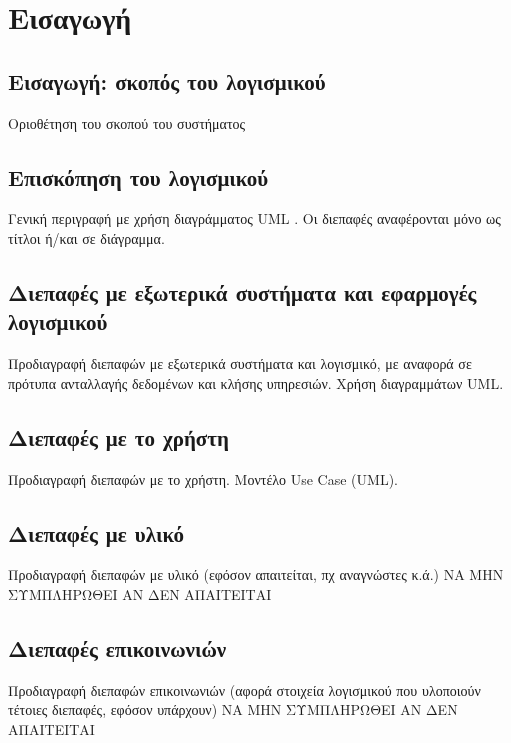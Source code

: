 \section{Εισαγωγή}

\subsection{Εισαγωγή: σκοπός του λογισμικού}
Οριοθέτηση του σκοπού του συστήματος

\subsection{Επισκόπηση του λογισμικού}
Γενική περιγραφή με χρήση διαγράμματος UML . Οι διεπαφές αναφέρονται μόνο ως τίτλοι ή/και σε
διάγραμμα.


\subsection{Διεπαφές με εξωτερικά συστήματα και εφαρμογές λογισμικού}
Προδιαγραφή διεπαφών με εξωτερικά συστήματα και λογισμικό, με αναφορά σε πρότυπα ανταλλαγής
δεδομένων και κλήσης υπηρεσιών. Χρήση διαγραμμάτων UML.


\subsection{Διεπαφές με το χρήστη}
Προδιαγραφή διεπαφών με το χρήστη. Μοντέλο Use Case (UML).


\subsection{Διεπαφές με υλικό}
Προδιαγραφή διεπαφών με υλικό (εφόσον απαιτείται, πχ αναγνώστες κ.ά.)
ΝΑ ΜΗΝ ΣΥΜΠΛΗΡΩΘΕΙ ΑΝ ΔΕΝ ΑΠΑΙΤΕΙΤΑΙ

\subsection{Διεπαφές επικοινωνιών}
Προδιαγραφή διεπαφών επικοινωνιών (αφορά στοιχεία λογισμικού που υλοποιούν τέτοιες διεπαφές, εφόσον
υπάρχουν)
ΝΑ ΜΗΝ ΣΥΜΠΛΗΡΩΘΕΙ ΑΝ ΔΕΝ ΑΠΑΙΤΕΙΤΑΙ